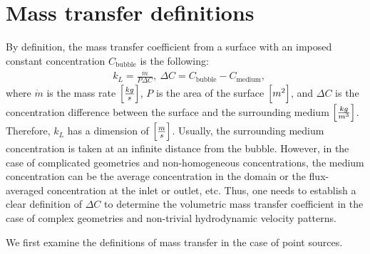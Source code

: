 \documentclass{article}
\newcommand{\beqal}{\begin{equation}\begin{aligned}}
\newcommand{\feqal}{\end{aligned}\end{equation}}
\newcommand{\cbubble}{C_{\mathrm{bubble}}}
\newcommand{\cmedium}{C_{\mathrm{medium}}}
\begin{document}
\section{Mass transfer definitions}
By definition, the mass transfer coefficient from a surface with an imposed constant
concentration $\cbubble$ is the following:
\beqal
\label{eq:main:definition}
&k_L=\frac{\dot{m}}{P \Delta C},\ \Delta C= \cbubble - \cmedium,
\feqal
where $\dot{m}$ is the mass rate $\Bigl[\frac{kg}{s}\Bigr]$, $P$ is the area of the surface
$\Bigl[m^2\Bigr]$, and $\Delta C$ is the concentration difference between the surface and the surrounding medium
$\Bigl[\frac{kg}{m^3}\Bigr]$. Therefore, $k_L$ has a dimension of 
$\Bigl[\frac{m}{s}\Bigr]$. Usually, the surrounding medium concentration is taken at an infinite distance
from the bubble. However, in the case of complicated geometries and non-homogeneous concentrations, 
the medium concentration can be the average concentration in the domain or the flux-averaged
concentration at the inlet or outlet, etc. Thus, one needs to establish a clear definition of  $\Delta C$ to determine the volumetric
mass transfer coefficient in the case of complex geometries and non-trivial hydrodynamic velocity patterns.

We first examine the
 definitions of mass transfer in the case of point  sources.
\end{document}
